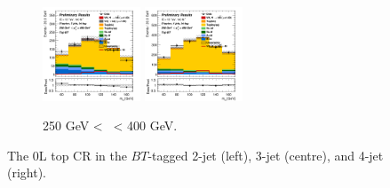 \begin{figure}[h!]
\begin{subfigure}[b]{\textwidth}
        \includegraphics[width=0.32\textwidth]{Images/VH/Own_fit/prefit_VHcc/Region_distmBB_BMax400_BMin250_DtopCRBC_J3_TTypebt_T1_L0_Y6051_Prefit.png}
        \includegraphics[width=0.32\textwidth]{Images/VH/Own_fit/prefit_VHcc/Region_distmBB_BMax400_BMin250_DtopCRBC_J4_TTypebt_T1_L0_Y6051_Prefit.png}
        \caption{250 GeV < \ptv\ < 400 GeV.}
        \label{fig:plots_VHcc_OL_250_TopCR_2c}
    \end{subfigure}
    \caption{The 0L top CR in the $BT$-tagged 2-jet (left), 3-jet (centre), and 4-jet (right).}
    \label{fig:plots_VHcc_OL_TopCR_2c}
\end{figure} 

\vspace*{\fill} \newpage
\vspace*{\fill} 

